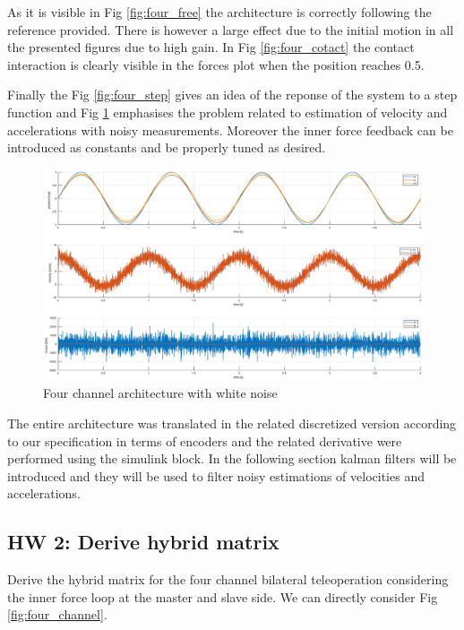 \documentclass[a4paper,12pt]{article}
\begin{document}
As it is visible in Fig \ref{fig:four_free} the architecture is correctly following the reference provided. There is however a large effect due to the initial motion in all the presented figures due to high gain. In Fig \ref{fig:four_cotact} the contact interaction is clearly visible in the forces plot when the position reaches 0.5. 

Finally the Fig \ref{fig:four_step} gives an idea of the reponse of the system to a step function and Fig \ref{fig:four_noisy} emphasises the problem related to estimation of velocity and accelerations with noisy measurements. Moreover the inner force feedback can be introduced as constants and be properly tuned as desired.

\begin{figure}[H]
    \begin{center}
        \hspace*{-4.2cm}
        \includegraphics[scale=0.4]{images/four_noisy.eps}
    \end{center}
    \caption{Four channel architecture with white noise}
    \label{fig:four_noisy}
\end{figure}

\noindent The entire architecture was translated in the related discretized version according to our specification in terms of encoders and the related derivative were performed using the simulink block. In the following section kalman filters will be introduced and they will be used to filter noisy estimations of velocities and accelerations.

\subsection{HW 2: Derive hybrid matrix}

Derive the hybrid matrix for the four channel bilateral teleoperation considering the inner force loop at the master and slave side. We can directly consider Fig \ref{fig:four_channel}.
\end{document}
